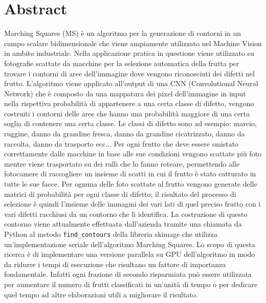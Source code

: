 \documentclass[12pt,a4paper]{report}
\begin{document}
\chapter*{Abstract}
Marching Squares (MS) è un algoritmo per la generazione di contorni in un campo scalare bidimensionale che viene ampiamente utilizzato nel Machine Vision in ambito industriale. Nella applicazione pratica in questione viene utilizzato su fotografie scattate da macchine per la selezione automatica della frutta per trovare i contorni di aree dell'immagine dove vengono riconosciuti dei difetti nel frutto. L'algoritmo viene applicato all'output di una CNN (Convolutional Neural Network) che è composto da una mappatura dei pixel dell'immagine in input nella rispettiva probabilità di appartenere a una certa classe di difetto, vengono costruiti i contorni delle aree che hanno una probabilità maggiore di una certa soglia di contenere una certa classe. Le classi di difetto sono ad esempio: marcio, ruggine, danno da grandine fresca, danno da grandine cicatrizzato, danno da raccolta, danno da trasporto ecc... \newline
Per ogni frutto che deve essere smistato correttamente dalle macchine in base alle sue condizioni vengono scattate più foto mentre viene trasportato su dei rulli che lo fanno roteare, permettendo alle fotocamere di raccogliere un insieme di scatti in cui il frutto è stato catturato in tutte le sue facce. Per ognuna delle foto scattate al frutto vengono generate delle matrici di probabilità per ogni classe di difetto; il risultato del processo di selezione è quindi l'insieme delle immagini dei vari lati di quel preciso frutto con i vari difetti racchiusi da un contorno che li identifica. \newline 
La costruzione di questo contorno viene attualmente effettuata dall'azienda tramite una chiamata da Python al metodo \verb|find_contours| della libreria skimage che utilizza un'implementazione seriale dell'algoritmo Marching Squares. Lo scopo di questa ricerca è di implementare una versione parallela su GPU dell'algoritmo in modo da ridurre i tempi di esecuzione che risultano un fattore di importanza fondamentale.  Infatti ogni frazione di secondo risparmiata può essere utilizzata per aumentare il numero di frutti classificati in un'unità di tempo o per dedicare quel tempo ad altre elaborazioni utili a migliorare il risultato. 
\end{document}
